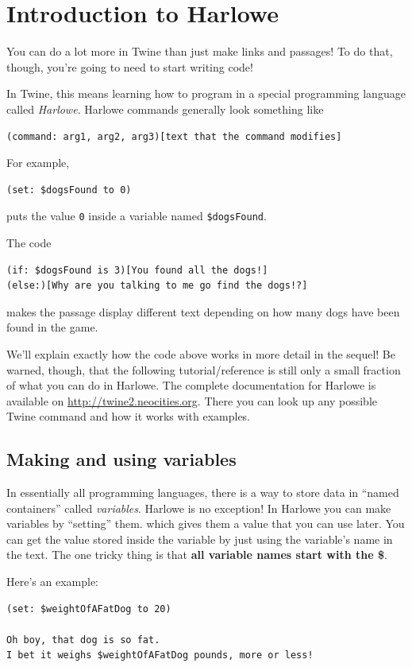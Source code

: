 \documentclass[a5paper,11pt]{article}
\begin{document}
\section{Introduction to Harlowe}
You can do a lot more in Twine than just make links and passages! To do that, though, you're going to need to start writing code!

In Twine, this means learning how to program in a special programming language called \emph{Harlowe}. Harlowe commands generally look something like
\begin{verbatim}
(command: arg1, arg2, arg3)[text that the command modifies]
\end{verbatim}

For example,
\begin{verbatim}
(set: $dogsFound to 0)
\end{verbatim}
puts the value \verb"0" inside a variable named \verb"$dogsFound".

The code
\begin{verbatim}
(if: $dogsFound is 3)[You found all the dogs!]
(else:)[Why are you talking to me go find the dogs!?]
\end{verbatim}
makes the passage display different text depending on how many dogs have been found in the game.

We'll explain exactly how the code above works in more detail in the sequel! Be warned, though, that the following tutorial/reference is still only a small fraction of what you can do in Harlowe. The complete documentation for Harlowe is available on \url{http://twine2.neocities.org}. There you can look up any possible Twine command and how it works with examples.
\subsection{Making and using variables}
In essentially all programming languages, there is a way to store data in ``named containers'' called \emph{variables}. Harlowe is no exception!
In Harlowe you can make variables by ``setting'' them. which gives them a value that you can use later. You can get the value stored inside the variable by just using the variable's name in the text. The one tricky thing is that \textbf{all variable names start with the \$}.

Here's an example:
\begin{verbatim}
(set: $weightOfAFatDog to 20)

Oh boy, that dog is so fat. 
I bet it weighs $weightOfAFatDog pounds, more or less!
\end{verbatim}
\end{document}
